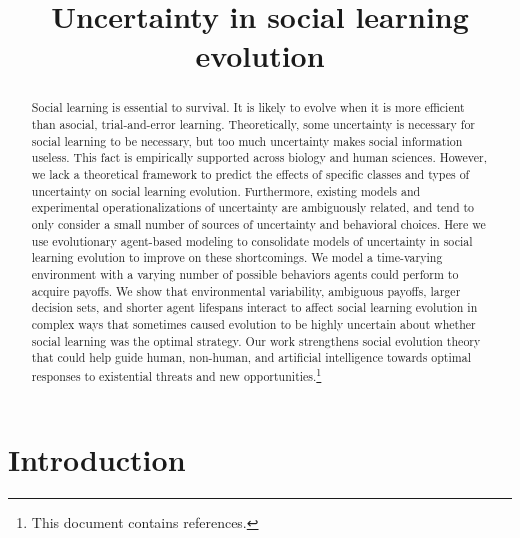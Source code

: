 \documentclass[letterpaper,11.5pt]{scrartcl}
\title{Uncertainty in social learning evolution}
\author{{}}
\begin{document}
\maketitle

\newcommand{\pisub}[1]{\pi_{\mathrm{#1}}}
\newcommand{\pilow}{\pisub{low}}
\newcommand{\pihigh}{\pisub{high}}
\newcommand{\piI}{\langle \pisub{I} \rangle}
\newcommand{\piS}{\langle \pisub{S} \rangle}
\newcommand{\ledger}{\bar\pi_{ib}}

\newcommand{\meanvar}[1]{\langle #1 \rangle}
\newcommand{\meansl}{\meanvar{s}}
\newcommand{\meanpi}{\meanvar{\pi}}
\newcommand{\meansoc}{\meanvar{\pi_\mathrm{S}}}
\newcommand{\meanasoc}{\meanvar{\pi_\mathrm{A}}}
\newcommand{\meanT}{\meanvar{T}}

\newcommand{\bandit}{\text{Bandit}_b(0, 1)}

\begin{abstract}

Social learning is essential to survival. It is likely to evolve when it is more
efficient than asocial, trial-and-error learning. Theoretically, some uncertainty is
necessary for social learning to be necessary, but too much uncertainty makes
social information useless. This fact is empirically
supported across biology and human sciences. However, we lack a theoretical
framework to predict the effects of specific classes and types of uncertainty on social
learning evolution. Furthermore, existing models and experimental operationalizations of
uncertainty are ambiguously related, and 
tend to only consider a small number of sources of uncertainty and behavioral
choices.  Here we use evolutionary agent-based modeling to consolidate
models of uncertainty in social learning evolution to improve on these
shortcomings. We model a time-varying environment with a varying number
of possible behaviors agents could perform to acquire payoffs.
We show that environmental variability, ambiguous payoffs, 
larger decision sets, and shorter agent lifespans interact to 
affect social learning evolution in complex ways that 
sometimes caused evolution to be highly uncertain about whether social learning was
the optimal strategy. 
Our work strengthens social evolution theory that could help 
guide human, non-human, and artificial intelligence towards optimal responses 
to existential threats and new opportunities.\footnote{This document contains
 references.}  
\end{abstract}

\section{Introduction}
\end{document}
